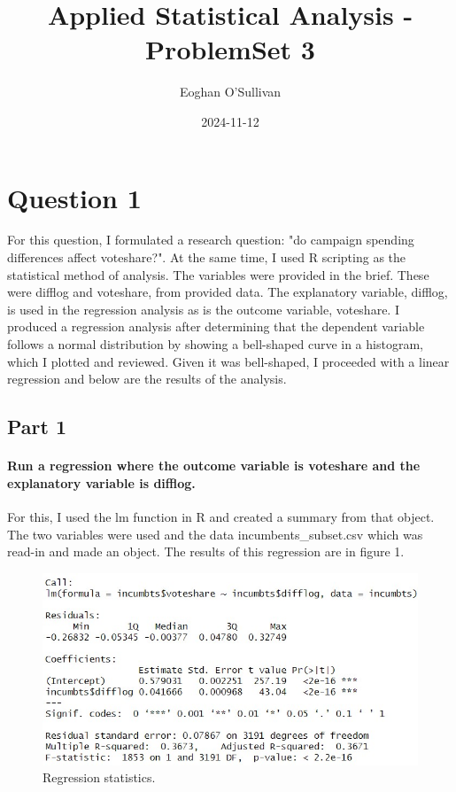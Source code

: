 \documentclass{article}
\title{Applied Statistical Analysis - ProblemSet 3}
\date{2024-11-12}
\author{Eoghan O'Sullivan}
\begin{document}
	\maketitle
	
	\section{Question 1}
	
	For this question, I formulated a research question: "do campaign spending differences affect voteshare?". At the same time, I used R scripting as the statistical method of analysis. The variables were provided in the brief. These were difflog and voteshare, from provided data. The explanatory variable, difflog, is used in the regression analysis as is the outcome variable, voteshare. I produced a regression analysis after determining that the dependent variable follows a normal distribution by showing a bell-shaped curve in a histogram, which I plotted and reviewed. Given it was bell-shaped, I proceeded with a linear regression and below are the results of the analysis.   
	
	\subsection{Part 1}
	\paragraph{Run a regression where the outcome variable is voteshare and the explanatory variable is difflog.}
	For this, I used the lm function in R and created a summary from that object. The two variables were used and the data incumbents\_subset.csv which was read-in and made an object. The results of this regression are in figure 1.
 		\begin{figure}[H]
 			\centering
 				\includegraphics[width=0.9\linewidth]{Question1RegressionAnalysis.jpg}
 				\caption{Regression statistics.}
 				\label{fig:Regression stats}
 		\end{figure}
\end{document}
